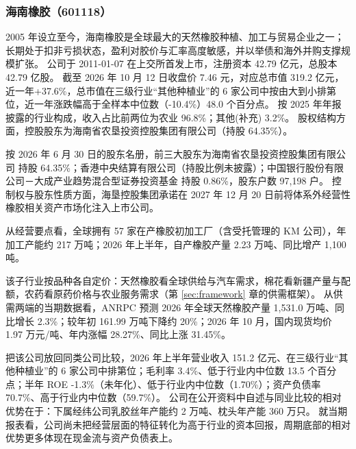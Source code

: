 
\subsubsection{海南橡胶（601118）}
\label{co:601118}

 2005 年设立至今，海南橡胶是全球最大的天然橡胶种植、加工与贸易企业之一；长期处于扣非亏损状态，盈利对胶价与汇率高度敏感，并以举债和海外并购支撑规模扩张。 公司于 2011-01-07 在上交所首发上市，注册资本 42.79 亿元，总股本 42.79 亿股。 截至 2026 年 10 月 12 日收盘价 7.46 元，对应总市值 319.2 亿元，近一年+37.6\%，总市值在三级行业“其他种植业”的 6 家公司中按由大到小排第位，近一年涨跌幅高于全样本中位数（-10.4\%）48.0 个百分点。 按 2025 年年报披露的行业构成，收入占比前两位为农业 96.8\%；其他(补充) 3.2\%。 股权结构方面，控股股东为海南省农垦投资控股集团有限公司（持股 64.35\%）。

 按 2026 年 6 月 30 日的股东名册，前三大股东为海南省农垦投资控股集团有限公司 持股 64.35\%；香港中央结算有限公司（持股比例未披露）；中国银行股份有限公司－大成产业趋势混合型证券投资基金 持股 0.86\%，股东户数 97,198 户。 控制权与股东性质方面，海垦控股集团承诺在 2027 年 12 月 20 日前将体系外经营性橡胶相关资产市场化注入上市公司。

 从经营要点看，全球拥有 57 家在产橡胶初加工厂（含受托管理的 KM 公司），年加工产能约 217 万吨；2026 年上半年，自产橡胶产量 2.23 万吨、同比增产 1,100 吨。

 该子行业按品种各自定价：天然橡胶看全球供给与汽车需求，棉花看新疆产量与配额，农药看原药价格与农业服务需求（第 \ref{sec:framework} 章的供需框架）。 从供需两端的当期数据看，ANRPC 预测 2026 年全球天然橡胶产量 1,531.0 万吨、同比增长 2.3\%；较年初 161.99 万吨下降约 20\%；2026 年 10 月，国内现货均价 1.97 万元/吨、年内涨幅 28.27\%、同比上涨 31.45\%。

 把该公司放回同类公司比较，2026 年上半年营业收入 151.2 亿元、在三级行业“其他种植业”的 6 家公司中排第位；毛利率 3.4\%、低于行业内中位数 13.5 个百分点；半年 ROE -1.3\%（未年化）、低于行业内中位数（1.70\%）；资产负债率 70.7\%、高于行业内中位数（59.7\%）。 公司在公开资料中自述与同业比较的相对优势在于：下属经纬公司乳胶丝年产能约 2 万吨、枕头年产能 360 万只。 就当期报表看，公司尚未把经营层面的特征转化为高于行业的资本回报，周期底部的相对优势更多体现在现金流与资产负债表上。

